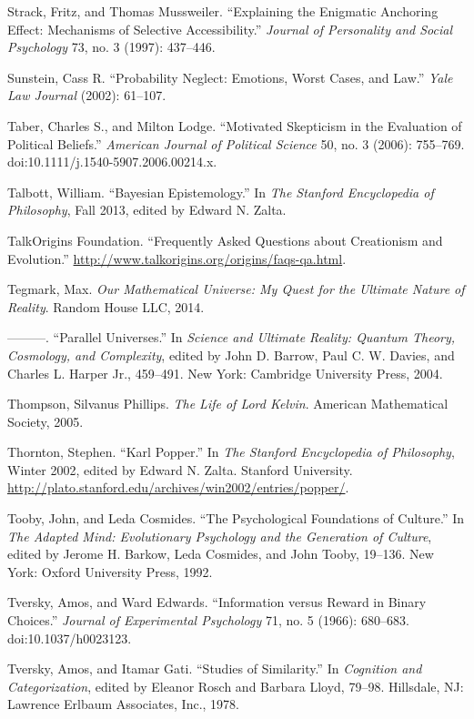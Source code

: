 \documentclass[letterpaper]{book}
\begin{document}
{
 Strack, Fritz, and Thomas Mussweiler.
``Explaining the Enigmatic Anchoring Effect:
Mechanisms of Selective Accessibility.''
\textit{Journal of Personality and Social Psychology} 73, no. 3 (1997):
437--446.}

{
 Sunstein, Cass R. ``Probability Neglect:
Emotions, Worst Cases, and Law.'' \textit{Yale Law
Journal} (2002): 61--107.}

{
 Taber, Charles S., and Milton Lodge. ``Motivated
Skepticism in the Evaluation of Political Beliefs.''
\textit{American Journal of Political Science} 50, no. 3 (2006):
755--769. doi:10.1111/j.1540-5907.2006.00214.x.}

{
 Talbott, William. ``Bayesian
Epistemology.'' In \textit{The Stanford Encyclopedia
of Philosophy}, Fall 2013, edited by Edward N. Zalta.}

{
 TalkOrigins Foundation. ``Frequently Asked
Questions about Creationism and Evolution.''
\url{http://www.talkorigins.org/origins/faqs-qa.html}.}

{
 Tegmark, Max. \textit{Our Mathematical Universe: My Quest for the
Ultimate Nature of Reality}. Random House LLC, 2014.}

{
 {}---{}---{}---. ``Parallel
Universes.'' In \textit{Science and Ultimate Reality:
Quantum Theory, Cosmology, and Complexity}, edited by John D. Barrow,
Paul C. W. Davies, and Charles L. Harper Jr., 459--491. New York:
Cambridge University Press, 2004.}

{
 Thompson, Silvanus Phillips. \textit{The Life of Lord Kelvin}.
American Mathematical Society, 2005.}

{
 Thornton, Stephen. ``Karl
Popper.'' In \textit{The Stanford Encyclopedia of
Philosophy}, Winter 2002, edited by Edward N. Zalta. Stanford
University.
\url{http://plato.stanford.edu/archives/win2002/entries/popper/}.}

{
 Tooby, John, and Leda Cosmides. ``The
Psychological Foundations of Culture.'' In
\textit{The Adapted Mind: Evolutionary Psychology and the Generation of
Culture}, edited by Jerome H. Barkow, Leda Cosmides, and John Tooby,
19--136. New York: Oxford University Press, 1992.}

{
 Tversky, Amos, and Ward Edwards. ``Information
versus Reward in Binary Choices.'' \textit{Journal of
Experimental Psychology} 71, no. 5 (1966): 680--683.
doi:10.1037/h0023123.}

{
 Tversky, Amos, and Itamar Gati. ``Studies of
Similarity.'' In \textit{Cognition and
Categorization}, edited by Eleanor Rosch and Barbara Lloyd, 79--98.
Hillsdale, NJ: Lawrence Erlbaum Associates, Inc., 1978.}
\end{document}
